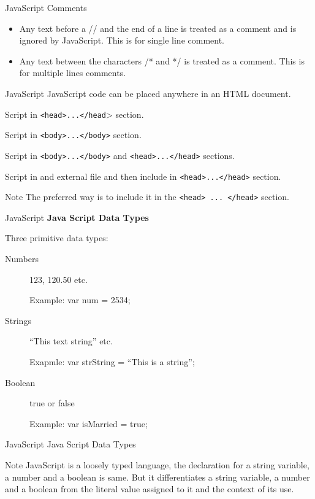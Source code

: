 \documentclass[14pt]{beamer}
\begin{document}
\begin{frame}{JavaScript}
Comments
\begin{itemize}
 \item Any text before a // and the end of a line is treated as a comment and is ignored by JavaScript. This is for single line comment.
 \item Any text between the characters /* and */ is treated as a comment. This is for multiple lines comments.
\end{itemize}
\end{frame}

\begin{frame}{JavaScript}
JavaScript code can be placed anywhere in an HTML document.

\vspace{1pc}
\colorbox{light-gray}{
\begin{minipage}{10cm}
Script in \lstinline!<head>...</head!> section. 

Script in \lstinline!<body>...</body>! section.

Script in \lstinline!<body>...</body>! and \lstinline!<head>...</head>! sections.

Script in and external file and then include in \lstinline!<head>...</head>! section.
\end{minipage}}
\begin{block}{Note}
The preferred way is to include it in the \lstinline!<head> ... </head>! section.
\end{block}
\end{frame}

\begin{frame}{JavaScript}
\textbf{Java Script Data Types}

\vspace{1pc}
Three primitive data types:
\begin{description}
 \item [Numbers] 123, 120.50 etc.
 
 Example: var num = 2534;
 \item [Strings] ``This text string'' etc.

 Exapmle: var strString = ``This is a string'';
 \item [Boolean] true or false 
 
 Example: var isMarried = true;
\end{description}
\end{frame}

\begin{frame}{JavaScript}
Java Script Data Types

\begin{block}{Note}
 JavaScript is a loosely typed language, the declaration for a string variable, a number and a boolean is same. But it differentiates a string variable, a number and a boolean from the literal value assigned to it and the context of its use.
\end{block}
\end{frame}
\end{document}
